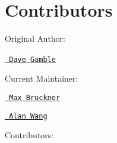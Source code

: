 \chapter{Contributors}
\hypertarget{md_lib_2c_j_s_o_n_2_c_o_n_t_r_i_b_u_t_o_r_s}{}\label{md_lib_2c_j_s_o_n_2_c_o_n_t_r_i_b_u_t_o_r_s}
Original Author\+:
\begin{DoxyItemize}
\item \href{https://github.com/DaveGamble}{\texttt{ Dave Gamble}} ~\newline

\end{DoxyItemize}

Current Maintainer\+:
\begin{DoxyItemize}
\item \href{https://github.com/FSMaxB}{\texttt{ Max Bruckner}}
\item \href{https://github.com/Alanscut}{\texttt{ Alan Wang}}
\end{DoxyItemize}

Contributors\+: ~\newline

